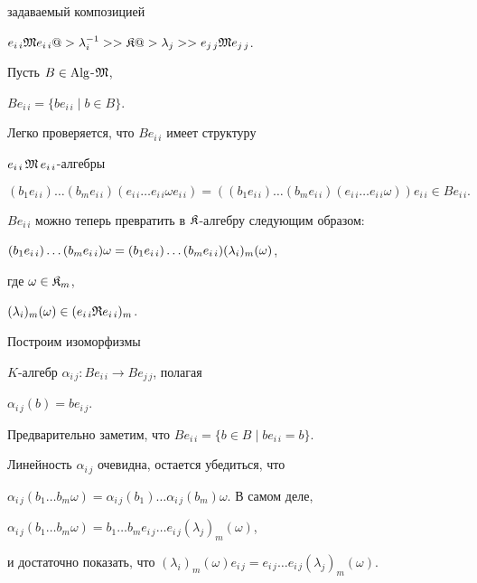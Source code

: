 \begin{pf}
задаваемый композицией


$e_{i\,i}\frak M e_{i\,i}@>{\lambda_i^{-1}}>>\frak K


@>{\lambda_j}>> e_{j\,j}\frak M e_{j\,j}$.





Пусть $B\in \operatorname{Alg}$-$\frak M$,


$Be_{i\, i}=\{be_{i\, i}\mid b\in B \}$.


Легко проверяется, что $Be_{i\, i}$ имеет структуру


$e_{i\,i}\,\frak M\, e_{i\,i}$-алгебры


$$


(b_1e_{i\,i})\dotsc (b_me_{i\,i})(e_{i\,i}\dotsc e_{i\,i}\omega e_{i\,i})=


((b_1e_{i\,i})\dotsc (b_me_{i\,i})(e_{i\,i}\dotsc e_{i\,i}\omega))e_{i\,i}


\in B e_{i\,i}.


$$


$Be_{i\, i}$ можно теперь превратить в $\frak K$-алгебру следующим образом:


$(b_1e_{i\,i})\dotsc(b_me_{i\,i})\omega=\linebreak


(b_1e_{i\,i})\dotsc (b_me_{i\,i})(\lambda_i)_m(\omega)$,


где $\omega\in \frak K_m$,


$(\lambda_i)_m(\omega)\in (e_{i\,i}\frak R e_{i\,i})_m$.





Построим изоморфизмы


$K$-алгебр $\alpha_{i\, j}:Be_{i\, i}\longrightarrow Be_{j\,j}$, полагая


$\alpha_{i\, j}(b)=be_{i\, j}$.


Предварительно заметим, что $Be_{i\, i}=\{b\in B\mid be_{i\,i}=b \}$.


Линейность $\alpha_{i\,j}$ очевидна, остается убедиться, что


$\alpha_{i\,j}(b_1\dotsc b_m\omega)=


\alpha_{i\,j}(b_1)\dotsc \alpha_{i\,j}(b_m)\omega$. В самом деле,


$\alpha_{i\,j}(b_1\dotsc b_m\omega)=


b_1\dotsc b_m e_{i\,j}\dotsc e_{i\,j}(\lambda_j)_m(\omega)$,


и достаточно показать, что $(\lambda_i)_m(\omega)e_{i\,j}=


e_{i\,j}\dotsc e_{i\,j}(\lambda_j)_m(\omega)$.



\end{pf}
